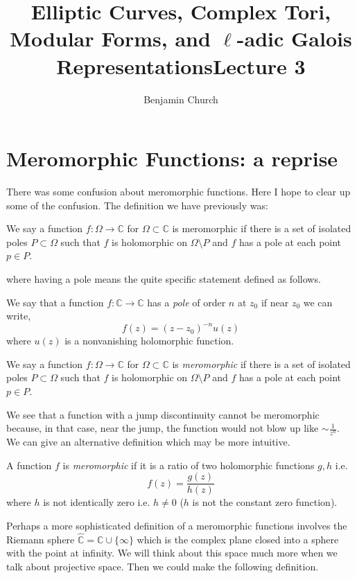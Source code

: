 \documentclass{article}
\title{Elliptic Curves, Complex Tori, Modular Forms, and $\ell$-adic Galois Representations}
\author{Benjamin Church}
\newcommand{\C}{\mathbb{C}}
\theoremstyle{definition}
\newenvironment{definition}[1][Definition:]{\begin{trivlist}
\item[\hskip \labelsep {\bfseries #1}]}{\end{trivlist}}
\begin{document}
\title{Lecture 3}

\maketitle

\section{Meromorphic Functions: a reprise}

There was some confusion about meromorphic functions. Here I hope to clear up some of the
confusion. The definition we have previously was:

\begin{definition}
We say a function $f : \Omega \to \C$ for $\Omega \subset \C$ is meromorphic if there is a set of isolated
poles $P \subset \Omega$ such that $f$ is holomorphic on $\Omega \setminus P$ and $f$ has a pole at each point $p \in P$.
\end{definition}
\noindent
where having a pole means the quite specific statement defined as follows.

\begin{definition}
We say that a function $f : \C \to \C$ has a \textit{pole} of order $n$ at $z_0$ if near $z_0$ we can write,
\[ f(z) = (z - z_0)^{-n} u(z) \]
where $u(z)$ is a nonvanishing holomorphic function.
\end{definition}

\begin{definition}
We say a function $f : \Omega \to \C$ for $\Omega \subset \C$ is \textit{meromorphic} if there is a set of isolated poles $P \subset \Omega$ such that $f$ is holomorphic on $\Omega \setminus P$ and $f$ has a pole at each point $p \in P$.
\end{definition}
\noindent
We see that a function with a jump discontinuity cannot be meromorphic because, in that case, near
the jump, the function would not blow up like $\sim \frac{1}{z^n}$. We can give an alternative definition which may be more intuitive.

\begin{definition}
A function $f$ is \textit{meromorphic} if it is a ratio of two holomorphic functions $g,h$ i.e.
\[ f(z) = \frac{g(z)}{h(z)} \]
where $h$ is not identically zero i.e. $h \neq 0$ ($h$ is not the constant zero function).
\end{definition}
\noindent
Perhaps a more sophisticated definition of a meromorphic functions involves the Riemann sphere
$\hat{\C} = \C \cup \{ \infty \}$ which is the complex plane closed into a sphere with the point at infinity. We will think about this space much more when we talk about projective space. Then we could make the
following definition.
\end{document}
